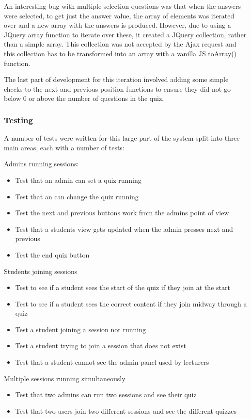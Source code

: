 An interesting bug with multiple selection questions was that when the answers were selected, to get just the answer value, the array of elements was iterated over and a new array with the answers is produced. However, due to using a JQuery array function to iterate over these, it created a JQuery collection, rather than a simple array. This collection was not accepted by the Ajax request and this collection has to be transformed into an array with a vanilla JS toArray() function.

The last part of development for this iteration involved adding some simple checks to the next and previous position functions to ensure they did not go below 0 or above the number of questions in the quiz.

\subsubsection{Testing}
A number of tests were written for this large part of the system split into three main areas, each with a number of tests:

Admins running sessions:
\begin{itemize}
	\item Test that an admin can set a quiz running
	\item Test that an can change the quiz running
	\item Test the next and previous buttons work from the admins point of view
	\item Test that a students view gets updated when the admin presses next and previous
	\item Test the end quiz button
\end{itemize}

Students joining sessions
\begin{itemize}
	\item Test to see if a student sees the start of the quiz if they join at the start
	\item Test to see if a student sees the correct content if they join midway through a quiz
	\item Test a student joining a session not running
	\item Test a student trying to join a session that does not exist
	\item Test that a student cannot see the admin panel used by lecturers
\end{itemize}

Multiple sessions running simultaneously
\begin{itemize}
	\item Test that two admins can run two sessions and see their quiz
	\item Test that two users join two different sessions and see the different quizzes
\end{itemize}
\newpage

